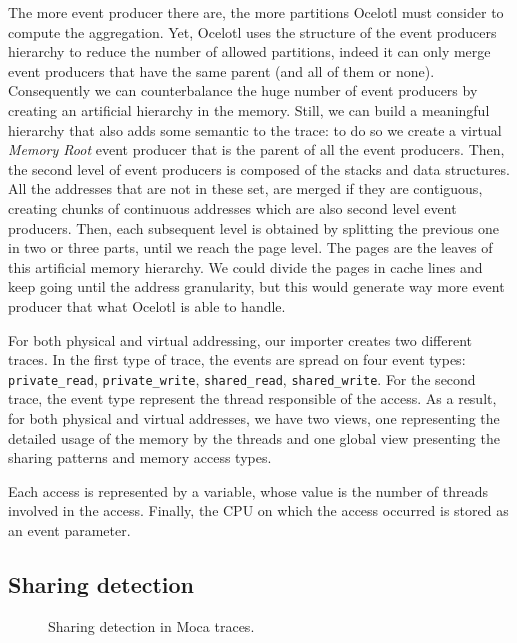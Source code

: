 The more event producer there are, the more partitions \gls{Ocelotl} must consider to compute the aggregation.
Yet, \gls{Ocelotl} uses the structure of the event producers hierarchy to reduce the number of allowed partitions, indeed it can only merge event producers that have the same parent (and all of them or none).
Consequently we can counterbalance the huge number of event producers by creating an artificial hierarchy in the memory.
Still, we can build a meaningful hierarchy that also adds some semantic to the trace: to do so we create a virtual \emph{Memory Root} event producer that is the parent of all the event producers.
Then, the second level of event producers is composed of the stacks and data structures.
All the addresses that are not in these set, are merged if they are contiguous, creating chunks of continuous addresses which are also second level event producers.
Then, each subsequent level is obtained by splitting the previous one in two or three parts, until we reach the page level.
The pages are the leaves of this artificial memory hierarchy.
We could divide the pages in cache lines and keep going until the address granularity, but this would generate way more event producer that what \gls{Ocelotl} is able to handle.

For both physical and virtual addressing, our importer creates two different traces.
In the first type of trace, the events are spread on four event types: \texttt{private\_read}, \texttt{private\_write}, \texttt{shared\_read}, \texttt{shared\_write}.
For the second trace, the event type represent the  thread responsible of the access.
As a result, for both physical and virtual addresses, we have two views, one representing the detailed usage of the memory by the threads and one global view presenting the sharing patterns and memory access types.

Each access is represented by a variable, whose value is the number of threads involved in the access.
Finally, the \gls{CPU} on which the access occurred is stored as an event parameter.

\subsection{Sharing detection}

\begin{figure}[htb]
    \centering
    
    \caption{Sharing detection in Moca traces.}
    \label{fig:sharing-detection}
\end{figure}


